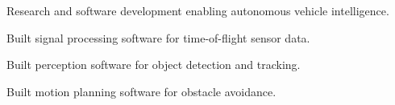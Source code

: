 \begin{loneinnerlist}
\item Research and software development enabling autonomous vehicle intelligence.
\item Built signal processing software for time-of-flight sensor data.
\item Built perception software for object detection and tracking.
\item Built motion planning software for obstacle avoidance.
\end{loneinnerlist}
